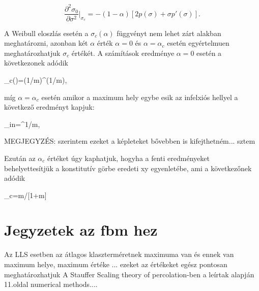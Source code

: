 \begin{equation}
\label{equ:consti_derivalt}
 \frac{\partial^2\sigma_0}{\partial\sigma^2}|_{\sigma_c}=-(1-\alpha)[2p(\sigma)+\sigma p'(\sigma)].
\end{equation}
 
 A Weibull eloszlás esetén a $\sigma_c(\alpha)$ függvényt nem lehet zárt alakban meghatározni, azonban két $\alpha$ érték $\alpha=0$ és $\alpha=\alpha_c$ esetén egyértelmuen
 meghatározhatjuk $\sigma_c$ értékét. A számítások eredménye $\alpha=0$ esetén a következonek adódik
 
\beq
\sigma_c()=\Lambda(1/m)^(1/m),
\eeq
 
 míg $\alpha=\alpha_c$ esetén amikor a maximum hely egybe esik az infelxiós hellyel a következő eredményt kapjuk:
 
\beq
\label{equ:inflex}
	\sigma_{in}=\Lambda[(1+m)/m]^{1/m},
\eeq

 MEGJEGYZÉS: szerintem ezeket a képleteket bővebben is kifejthetném... sztem
 
 Ezután az $\alpha_c$ értéket úgy kaphatjuk, hogyha a fenti eredményeket behelyettesítjük a konstitutív görbe eredeti xy egyenletébe, ami a következőnek adódik
 
\beq
\label{equ:consti3} 
\alpha_c=m/[1+m]
\eeq


\section*{Jegyzetek az fbm hez}
Az LLS esetben az átlagos klaszterméretnek maximuma van és ennek van maximum helye, maximum értéke ... ezeket az értékeket egész pontosan meghatározhatjuk A Stauffer Scaling theory of percolation-ben a leírtak alapján 11.oldal numerical methods....
